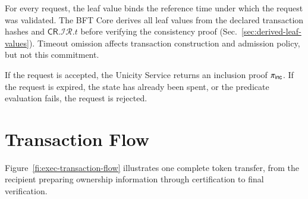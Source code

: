 For every request, the leaf value binds the reference time under which the request was validated. The BFT Core derives all leaf values from the declared transaction hashes and $\mathsf{CR}.\mathcal{IR}.t$ before verifying the consistency proof (Sec.~\ref{sec:derived-leaf-values}). Timeout omission affects transaction construction and admission policy, but not this commitment.

If the request is accepted, the Unicity Service returns an inclusion proof ${\pi_\mathsf{inc}}$. If the request is expired, the state has already been spent, or the predicate evaluation fails, the request is rejected.


\section{Transaction Flow}\label{sec:transaction-flow}

Figure~\ref{fi:exec-transaction-flow} illustrates one complete token transfer, from the recipient preparing ownership information through certification to final verification.

